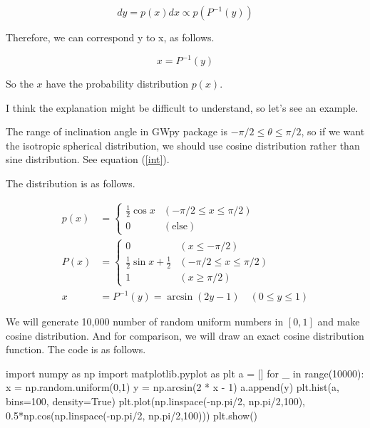 \begin{equation}
    dy = p(x)dx \propto p(P^{-1}(y))
\end{equation}

Therefore, we can correspond y to x, as follows.

\begin{equation}
    x = P^{-1}(y)
\end{equation}

So the $x$ have the probability distribution $p(x)$.

I think the explanation might be difficult to understand, so let's see an example.

\begin{example}

The range of inclination angle in GWpy package is $-\pi/2 \leq \theta \leq \pi/2$, so if we want the isotropic spherical distribution, we should use cosine distribution rather than sine distribution. See equation (\ref{int}).

The distribution is as follows.

\begin{align}
    p(x) &= \begin{cases} \frac{1}{2} \cos{x} & ( -\pi/2 \leq x \leq \pi/2) \\ 0 & (\mathrm{else}) \end{cases} \\
    P(x) &= \begin{cases} 0 & (x \leq -\pi/2 ) \\ \frac{1}{2} \sin{x} + \frac{1}{2} & ( -\pi/2 \leq x \leq \pi/2) \\ 1 & (x \geq \pi/2 ) \end{cases} \\
    x &= P^{-1} (y) = \arcsin{(2y - 1)} \quad (0 \leq y \leq 1)
\end{align}

We will generate 10,000 number of random uniform numbers in $[0,1]$ and make cosine distribution. And for comparison, we will draw an exact cosine distribution function. The code is as follows.

\begin{python}[Python3]
import numpy as np
import matplotlib.pyplot as plt
a = []
for _ in range(10000):
    x = np.random.uniform(0,1)
    y = np.arcsin(2 * x - 1)
    a.append(y)
plt.hist(a, bins=100, density=True)
plt.plot(np.linspace(-np.pi/2, np.pi/2,100), 0.5*np.cos(np.linspace(-np.pi/2, np.pi/2,100)))
plt.show()
\end{python}


\end{example}
